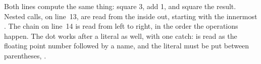 Both lines compute the same thing: square 3, add 1, and square the result.
Nested calls, on line~13, are read from the inside out, starting with the
innermost . The chain on line~14 is read from left to right, in
the order the operations happen. The dot works after a literal as well, with one
catch:  is read as the floating point number  followed
by a name, and the literal must be put between parentheses,
.

